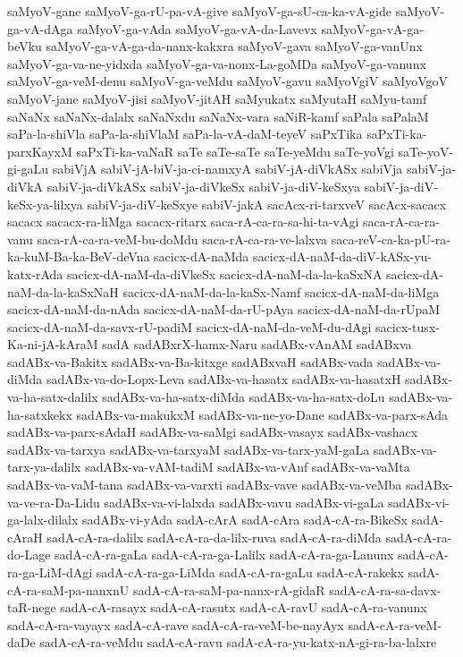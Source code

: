 {saMyoV-gane
saMyoV-ga-rU-pa-vA-give
saMyoV-ga-sU-ca-ka-vA-gide
saMyoV-ga-vA-dAga
saMyoV-ga-vAda
saMyoV-ga-vA-da-Lavevx
saMyoV-ga-vA-ga-beVku
saMyoV-ga-vA-ga-da-nanx-kakxra
saMyoV-gava
saMyoV-ga-vanUnx
saMyoV-ga-va-ne-yidxda
saMyoV-ga-va-nonx-La-goMDa
saMyoV-ga-vanunx
saMyoV-ga-veM-denu
saMyoV-ga-veMdu
saMyoV-gavu
saMyoVgiV
saMyoVgoV
saMyoV-jane
saMyoV-jisi
saMyoV-jitAH
saMyukatx
saMyutaH
saMyu-tamf
saNaNx
saNaNx-dalalx
saNaNxdu
saNaNx-vara
saNiR-kamf
saPala
saPalaM
saPa-la-shiVla
saPa-la-shiVlaM
saPa-la-vA-daM-teyeV
saPxTika
saPxTi-ka-parxKayxM
saPxTi-ka-vaNaR
saTe
saTe-saTe
saTe-yeMdu
saTe-yoVgi
saTe-yoV-gi-gaLu
sabiVjA
sabiV-jA-biV-ja-ci-namxyA
sabiV-jA-diVkASx
sabiVja
sabiV-ja-diVkA
sabiV-ja-diVkASx
sabiV-ja-diVkeSx
sabiV-ja-diV-keSxya
sabiV-ja-diV-keSx-ya-lilxya
sabiV-ja-diV-keSxye
sabiV-jakA
sacAcx-ri-tarxveV
sacAcx-sacacx
sacacx
sacacx-ra-liMga
sacacx-ritarx
saca-rA-ca-ra-sa-hi-ta-vAgi
saca-rA-ca-ra-vanu
saca-rA-ca-ra-veM-bu-doMdu
saca-rA-ca-ra-ve-lalxva
saca-reV-ca-ka-pU-ra-ka-kuM-Ba-ka-BeV-deVna
sacicx-dA-naMda
sacicx-dA-naM-da-diV-kASx-yu-katx-rAda
sacicx-dA-naM-da-diVkeSx
sacicx-dA-naM-da-la-kaSxNA
sacicx-dA-naM-da-la-kaSxNaH
sacicx-dA-naM-da-la-kaSx-Namf
sacicx-dA-naM-da-liMga
sacicx-dA-naM-da-nAda
sacicx-dA-naM-da-rU-pAya
sacicx-dA-naM-da-rUpaM
sacicx-dA-naM-da-savx-rU-padiM
sacicx-dA-naM-da-veM-du-dAgi
sacicx-tusx-Ka-ni-jA-kAraM
sadA
sadABxrX-hamx-Naru
sadABx-vAnAM
sadABxva
sadABx-va-Bakitx
sadABx-va-Ba-kitxge
sadABxvaH
sadABx-vada
sadABx-va-diMda
sadABx-va-do-Lopx-Leva
sadABx-va-hasatx
sadABx-va-hasatxH
sadABx-va-ha-satx-dalilx
sadABx-va-ha-satx-diMda
sadABx-va-ha-satx-doLu
sadABx-va-ha-satxkekx
sadABx-va-makukxM
sadABx-va-ne-yo-Dane
sadABx-va-parx-sAda
sadABx-va-parx-sAdaH
sadABx-va-saMgi
sadABx-vasayx
sadABx-vashacx
sadABx-va-tarxya
sadABx-va-tarxyaM
sadABx-va-tarx-yaM-gaLa
sadABx-va-tarx-ya-dalilx
sadABx-va-vAM-tadiM
sadABx-va-vAnf
sadABx-va-vaMta
sadABx-va-vaM-tana
sadABx-va-varxti
sadABx-vave
sadABx-va-veMba
sadABx-va-ve-ra-Da-Lidu
sadABx-va-vi-lalxda
sadABx-vavu
sadABx-vi-gaLa
sadABx-vi-ga-lalx-dilalx
sadABx-vi-yAda
sadA-cArA
sadA-cAra
sadA-cA-ra-BikeSx
sadA-cAraH
sadA-cA-ra-dalilx
sadA-cA-ra-da-lilx-ruva
sadA-cA-ra-diMda
sadA-cA-ra-do-Lage
sadA-cA-ra-gaLa
sadA-cA-ra-ga-Lalilx
sadA-cA-ra-ga-Lanunx
sadA-cA-ra-ga-LiM-dAgi
sadA-cA-ra-ga-LiMda
sadA-cA-ra-gaLu
sadA-cA-rakekx
sadA-cA-ra-saM-pa-nanxnU
sadA-cA-ra-saM-pa-nanx-rA-gidaR
sadA-cA-ra-sa-davx-taR-nege
sadA-cA-rasayx
sadA-cA-rasutx
sadA-cA-ravU
sadA-cA-ra-vanunx
sadA-cA-ra-vayayx
sadA-cA-rave
sadA-cA-ra-veM-be-nayAyx
sadA-cA-ra-veM-daDe
sadA-cA-ra-veMdu
sadA-cA-ravu
sadA-cA-ra-yu-katx-nA-gi-ra-ba-lalxre
}
